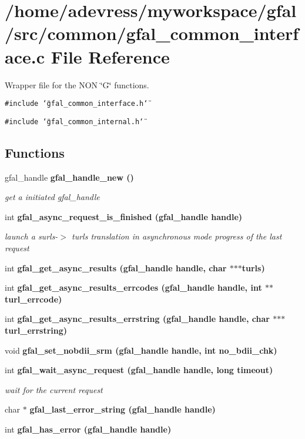 \section{/home/adevress/myworkspace/gfal/src/common/gfal\_\-common\_\-interface.c File Reference}
\label{gfal__common__interface_8c}
Wrapper file for the NON \char`\"{}G\char`\"{} functions. 

{\tt \#include \char`\"{}gfal\_\-common\_\-interface.h\char`\"{}}\par
{\tt \#include \char`\"{}gfal\_\-common\_\-internal.h\char`\"{}}\par
\subsection*{Functions}
\begin{CompactItemize}
\item 
gfal\_\-handle \bf{gfal\_\-handle\_\-new} ()
\begin{CompactList}\small\item\em get a initiated gfal\_\-handle \item\end{CompactList}\item 
int \bf{gfal\_\-async\_\-request\_\-is\_\-finished} (gfal\_\-handle handle)
\begin{CompactList}\small\item\em launch a surls-$>$ turls translation in asynchronous mode progress of the last request \item\end{CompactList}\item 
int \bf{gfal\_\-get\_\-async\_\-results} (gfal\_\-handle handle, char $\ast$$\ast$$\ast$turls)
\item 
int \bf{gfal\_\-get\_\-async\_\-results\_\-errcodes} (gfal\_\-handle handle, int $\ast$$\ast$turl\_\-errcode)
\item 
int \bf{gfal\_\-get\_\-async\_\-results\_\-errstring} (gfal\_\-handle handle, char $\ast$$\ast$$\ast$turl\_\-errstring)
\item 
void \bf{gfal\_\-set\_\-nobdii\_\-srm} (gfal\_\-handle handle, int no\_\-bdii\_\-chk)
\item 
int \bf{gfal\_\-wait\_\-async\_\-request} (gfal\_\-handle handle, long timeout)
\begin{CompactList}\small\item\em wait for the current request \item\end{CompactList}\item 
char $\ast$ \bf{gfal\_\-last\_\-error\_\-string} (gfal\_\-handle handle)
\item 
int \bf{gfal\_\-has\_\-error} (gfal\_\-handle handle)
\end{CompactItemize}



